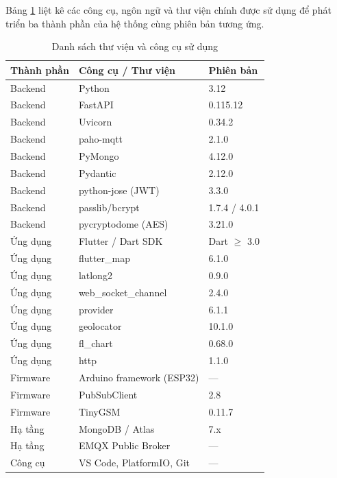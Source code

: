 \documentclass[../DoAn.tex]{subfiles}
\begin{document}
    Bảng \ref{table:congcu} liệt kê các công cụ, ngôn ngữ và thư viện chính được sử dụng để phát triển ba thành phần của hệ thống cùng phiên bản tương ứng.

    \begin{table}[H]
    \centering
    \caption{Danh sách thư viện và công cụ sử dụng}
    \label{table:congcu}
    \begin{tabular}{|l|l|l|}
    \hline
    \textbf{Thành phần} & \textbf{Công cụ / Thư viện} & \textbf{Phiên bản} \\ \hline
    Backend & Python & 3.12 \\ \hline
    Backend & FastAPI & 0.115.12 \\ \hline
    Backend & Uvicorn & 0.34.2 \\ \hline
    Backend & paho-mqtt & 2.1.0 \\ \hline
    Backend & PyMongo & 4.12.0 \\ \hline
    Backend & Pydantic & 2.12.0 \\ \hline
    Backend & python-jose (JWT) & 3.3.0 \\ \hline
    Backend & passlib/bcrypt & 1.7.4 / 4.0.1 \\ \hline
    Backend & pycryptodome (AES) & 3.21.0 \\ \hline
    Ứng dụng & Flutter / Dart SDK & Dart $\geq$ 3.0 \\ \hline
    Ứng dụng & flutter\_map & 6.1.0 \\ \hline
    Ứng dụng & latlong2 & 0.9.0 \\ \hline
    Ứng dụng & web\_socket\_channel & 2.4.0 \\ \hline
    Ứng dụng & provider & 6.1.1 \\ \hline
    Ứng dụng & geolocator & 10.1.0 \\ \hline
    Ứng dụng & fl\_chart & 0.68.0 \\ \hline
    Ứng dụng & http & 1.1.0 \\ \hline
    Firmware & Arduino framework (ESP32) & --- \\ \hline
    Firmware & PubSubClient & 2.8 \\ \hline
    Firmware & TinyGSM & 0.11.7 \\ \hline
    Hạ tầng & MongoDB / Atlas & 7.x \\ \hline
    Hạ tầng & EMQX Public Broker & --- \\ \hline
    Công cụ & VS Code, PlatformIO, Git & --- \\ \hline
    \end{tabular}
    \end{table}
\end{document}
